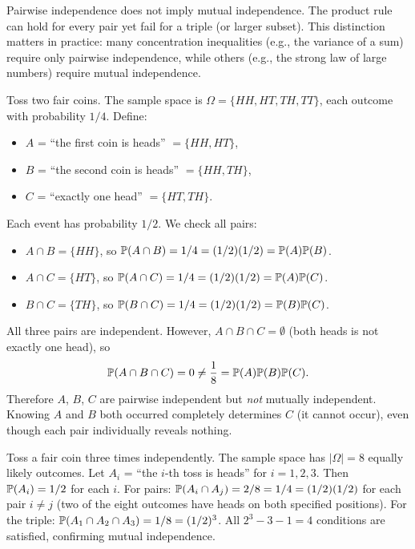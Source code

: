 \documentclass[11pt,a4paper]{article}
\begin{document}
\begin{warning}[title={Pairwise $\neq$ Mutual Independence}]
Pairwise independence does not imply mutual independence. The product
rule can hold for every pair yet fail for a triple (or larger subset).
This distinction matters in practice: many concentration inequalities
(e.g., the variance of a sum) require only pairwise independence, while
others (e.g., the strong law of large numbers) require mutual
independence.
\end{warning}

\begin{example}
\label{ex:pairwise_not_mutual}
Toss two fair coins. The sample space is
$\Omega = \{HH, HT, TH, TT\}$, each outcome with probability $1/4$.
Define:
\begin{itemize}[nosep]
    \item $A$ = ``the first coin is heads'' $= \{HH, HT\}$,
    \item $B$ = ``the second coin is heads'' $= \{HH, TH\}$,
    \item $C$ = ``exactly one head'' $= \{HT, TH\}$.
\end{itemize}
Each event has probability $1/2$. We check all pairs:
\begin{itemize}[nosep]
    \item $A \cap B = \{HH\}$, so
    $\mathbb{P}(A \cap B) = 1/4 = (1/2)(1/2) = \mathbb{P}(A)\mathbb{P}(B)$. \checkmark
    \item $A \cap C = \{HT\}$, so
    $\mathbb{P}(A \cap C) = 1/4 = (1/2)(1/2) = \mathbb{P}(A)\mathbb{P}(C)$. \checkmark
    \item $B \cap C = \{TH\}$, so
    $\mathbb{P}(B \cap C) = 1/4 = (1/2)(1/2) = \mathbb{P}(B)\mathbb{P}(C)$. \checkmark
\end{itemize}
All three pairs are independent. However,
$A \cap B \cap C = \emptyset$ (both heads is not exactly one head), so
\[
    \mathbb{P}(A \cap B \cap C) = 0
    \neq \frac{1}{8}
    = \mathbb{P}(A)\mathbb{P}(B)\mathbb{P}(C).
\]
Therefore $A$, $B$, $C$ are pairwise independent but \emph{not}
mutually independent. Knowing $A$ and $B$ both occurred completely
determines $C$ (it cannot occur), even though each pair individually
reveals nothing.
\end{example}

\begin{example}
\label{ex:mutual_indep_trials}
Toss a fair coin three times independently. The sample space has
$|\Omega| = 8$ equally likely outcomes. Let $A_i$ = ``the $i$-th toss
is heads'' for $i = 1, 2, 3$. Then $\mathbb{P}(A_i) = 1/2$ for each $i$.
For pairs:
$\mathbb{P}(A_i \cap A_j) = 2/8 = 1/4 = (1/2)(1/2)$ for each pair
$i \neq j$ (two of the eight outcomes have heads on both specified
positions). For the triple:
$\mathbb{P}(A_1 \cap A_2 \cap A_3) = 1/8 = (1/2)^3$.
All $2^3 - 3 - 1 = 4$ conditions are satisfied, confirming mutual
independence.
\end{example}
\end{document}

